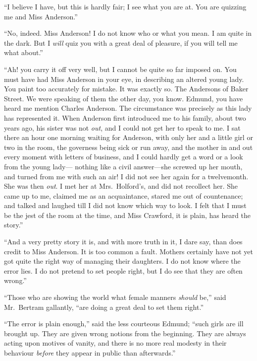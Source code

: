 \documentclass{article}
\begin{document}
``I believe I have, but this is hardly fair; I see what you
are at.  You are quizzing me and Miss Anderson.''

``No, indeed.  Miss Anderson!  I do not know who or what
you mean.  I am quite in the dark.  But I \emph{will} quiz you
with a great deal of pleasure, if you will tell me what about.''

``Ah! you carry it off very well, but I cannot be quite
so far imposed on.  You must have had Miss Anderson
in your eye, in describing an altered young lady.
You paint too accurately for mistake.  It was exactly so.
The Andersons of Baker Street.  We were speaking of them
the other day, you know.  Edmund, you have heard me mention
Charles Anderson.  The circumstance was precisely as this
lady has represented it.  When Anderson first introduced
me to his family, about two years ago, his sister was
not \emph{out}, and I could not get her to speak to me.
I sat there an hour one morning waiting for Anderson,
with only her and a little girl or two in the room,
the governess being sick or run away, and the mother
in and out every moment with letters of business, and I
could hardly get a word or a look from the young lady---%
nothing like a civil answer---she screwed up her mouth,
and turned from me with such an air!  I did not see
her again for a twelvemonth.  She was then \emph{out}.
I met her at Mrs.\ Holford's, and did not recollect her.
She came up to me, claimed me as an acquaintance, stared me
out of countenance; and talked and laughed till I did not
know which way to look.  I felt that I must be the jest
of the room at the time, and Miss Crawford, it is plain,
has heard the story.''

``And a very pretty story it is, and with more truth
in it, I dare say, than does credit to Miss Anderson.
It is too common a fault.  Mothers certainly have not yet
got quite the right way of managing their daughters.
I do not know where the error lies.  I do not pretend to set
people right, but I do see that they are often wrong.''

``Those who are showing the world what female manners
\emph{should} be,'' said Mr.\ Bertram gallantly, ``are doing
a great deal to set them right.''

``The error is plain enough,'' said the less courteous Edmund;
``such girls are ill brought up.  They are given wrong notions
from the beginning.  They are always acting upon motives
of vanity, and there is no more real modesty in their
behaviour \emph{before} they appear in public than afterwards.''
\end{document}
